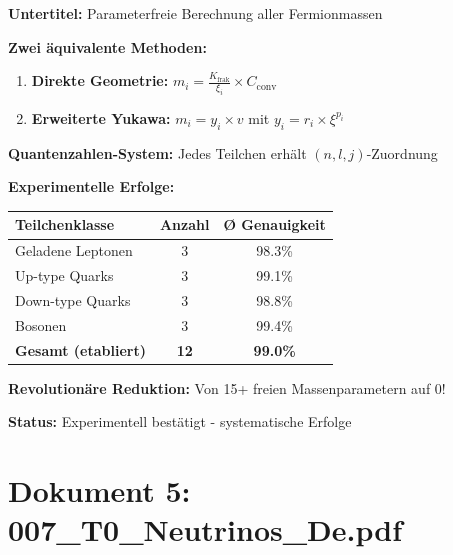 	\begin{documentbox}
		\textbf{Untertitel:} Parameterfreie Berechnung aller Fermionmassen
		
		\textbf{Zwei äquivalente Methoden:}
		\begin{enumerate}
			\item \textbf{Direkte Geometrie:} $m_i = \frac{K_{\text{frak}}}{\xi_i} \times C_{\text{conv}}$
			\item \textbf{Erweiterte Yukawa:} $m_i = y_i \times v$ mit $y_i = r_i \times \xi^{p_i}$
		\end{enumerate}
		
		\textbf{Quantenzahlen-System:} Jedes Teilchen erhält $(n,l,j)$-Zuordnung
		
		\textbf{Experimentelle Erfolge:}
		\begin{center}
			\begin{tabular}{lcc}
				\toprule
				\textbf{Teilchenklasse} & \textbf{Anzahl} & \textbf{Ø Genauigkeit} \\
				\midrule
				Geladene Leptonen & 3 & 98.3\% \\
				Up-type Quarks & 3 & 99.1\% \\
				Down-type Quarks & 3 & 98.8\% \\
				Bosonen & 3 & 99.4\% \\
				\midrule
				\textbf{Gesamt (etabliert)} & \textbf{12} & \textbf{99.0\%} \\
				\bottomrule
			\end{tabular}
		\end{center}
		
		\textbf{Revolutionäre Reduktion:} Von 15+ freien Massenparametern auf 0!
		
		\textbf{Status:} Experimentell bestätigt - systematische Erfolge
	\end{documentbox}
	
	\section{Dokument 5: 007\_T0\_Neutrinos\_De.pdf}
	
